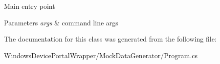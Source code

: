 Main entry point 


\begin{DoxyParams}{Parameters}
{\em args} & command line args\\
\hline
\end{DoxyParams}


The documentation for this class was generated from the following file\+:\begin{DoxyCompactItemize}
\item 
Windows\+Device\+Portal\+Wrapper/\+Mock\+Data\+Generator/Program.\+cs\end{DoxyCompactItemize}
